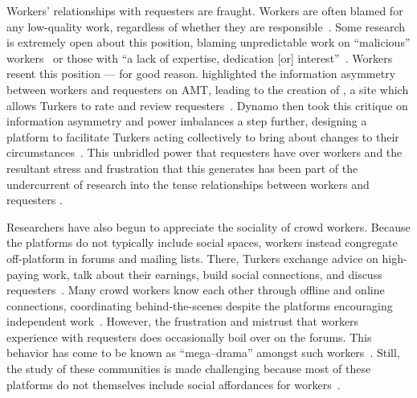 \documentclass[trackingWork]{subfiles}
\begin{document}
Workers' relationships with requesters are fraught.
Workers are often blamed for any low-quality work, regardless of whether they are responsible~\cite{martin2014being,takingAHITMcInnis}.
Some research is extremely open about this position, blaming unpredictable work on ``malicious'' workers~\cite{MaliciousCrowdworkersGadiraju} or those with ``a lack of expertise, dedication [or] interest''~\cite{Sheng:2008:GLI:1401890.1401965}.
Workers resent this position --- for good reason.
\citeauthor{turkopticon} highlighted the information asymmetry between workers and requesters on AMT, leading to the creation of \TO, a site which allows Turkers to rate and review requesters~\cite{turkopticon}.
Dynamo then took this critique on information asymmetry and power imbalances a step further, designing a platform to facilitate
Turkers acting collectively to bring about changes to their circumstances~\cite{dynamo}.
This unbridled power that requesters have over workers and
the resultant stress and frustration that this generates
has been part of the undercurrent of research into
the tense relationships between workers and requesters
\cite{fixingChaos,dynamo}.

Researchers have also begun to appreciate the sociality of crowd workers.
Because the platforms do not typically include social spaces, workers instead congregate off-platform in forums and mailing lists.
There, Turkers exchange advice on high-paying work, talk about their earnings, build social connections, and discuss requesters~\cite{martin2014being}.
Many crowd workers know each other through offline and online connections, coordinating behind-the-scenes despite the platforms encouraging independent work~\cite{crowdcollab,yin2016communication}.
However, the frustration and mistrust that workers experience with requesters does occasionally boil over on the forums. 
This behavior has come to be known as ``mega--drama'' amongst such workers~\cite{dynamo}.
Still, the study of these communities is made challenging because most of these platforms do not themselves include social affordances for workers~\cite{miller2011understanding}.
\end{document}
